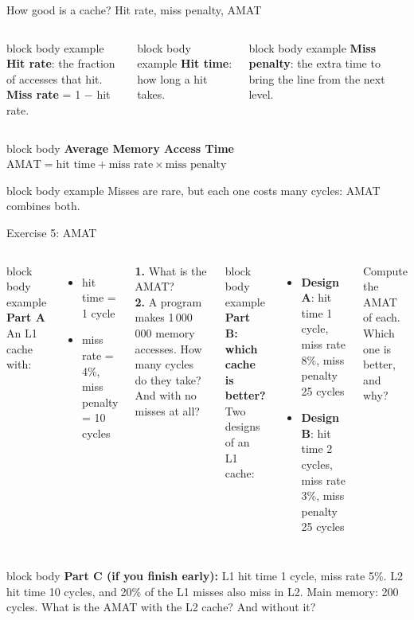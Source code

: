 \documentclass[aspectratio=169,10pt]{beamer}
\newcommand{\defbox}[1]{%
  \begin{beamercolorbox}[rounded=true,sep=0.1cm,wd=\linewidth]{block body example}
    \footnotesize #1
  \end{beamercolorbox}\vspace{0.06cm}}
\newcommand{\taskhead}[2]{%
  \begin{beamercolorbox}[rounded=true,sep=0.12cm,wd=\linewidth]{block body example}
    \small\textbf{#1}\\[0.04cm]
    \footnotesize #2
  \end{beamercolorbox}\vspace{0.1cm}}
\newcommand{\keymsg}[1]{%
  \begin{beamercolorbox}[rounded=true,sep=0.1cm,wd=\textwidth]{block body example}
    \centering\footnotesize #1
  \end{beamercolorbox}}
\begin{document}
\begin{frame}{How good is a cache? Hit rate, miss penalty, AMAT}
  \begin{columns}[T,onlytextwidth]
      \defbox{\textbf{Hit rate}: the fraction of accesses that hit.\\ \textbf{Miss rate} = 1 $-$ hit rate.}
      \defbox{\textbf{Hit time}: how long a hit takes.\\ \phantom{x}}
      \defbox{\textbf{Miss penalty}: the extra time to bring the line from the next level.}
  \end{columns}
  \vspace{0.15cm}
  \begin{beamercolorbox}[rounded=true,sep=0.14cm,wd=\textwidth]{block body}
    \centering
    \textbf{Average Memory Access Time}\\[0.05cm]
    $\displaystyle \text{AMAT} = \text{hit time} + \text{miss rate} \times \text{miss penalty}$
  \end{beamercolorbox}
  \vfill
  \keymsg{Misses are rare, but each one costs many cycles: AMAT combines both.}
\end{frame}

\begin{frame}{Exercise 5: AMAT}
  \begin{columns}[T,onlytextwidth]
      \taskhead{Part A}{An L1 cache with:}
      \footnotesize
      \begin{itemize}\setlength{\itemsep}{2pt}
        \item hit time = 1 cycle
        \item miss rate = 4\%, miss penalty = 10 cycles
      \end{itemize}
      \vspace{0.1cm}
      \textbf{1.} What is the AMAT?\\
      \textbf{2.} A program makes 1\,000\,000 memory accesses. How many cycles do they take? And with no misses at all?
      \taskhead{Part B: which cache is better?}{Two designs of an L1 cache:}
      \footnotesize
      \begin{itemize}\setlength{\itemsep}{2pt}
        \item \textbf{Design A}: hit time 1 cycle, miss rate 8\%, miss penalty 25 cycles
        \item \textbf{Design B}: hit time 2 cycles, miss rate 3\%, miss penalty 25 cycles
      \end{itemize}
      \vspace{0.1cm}
      Compute the AMAT of each. Which one is better, and why?
  \end{columns}
  \vfill
  \begin{beamercolorbox}[rounded=true,sep=0.1cm,wd=\textwidth]{block body}
    \scriptsize\textbf{Part C (if you finish early):} L1 hit time 1 cycle, miss rate 5\%.
    L2 hit time 10 cycles, and 20\% of the L1 misses also miss in L2. Main memory: 200 cycles.
    What is the AMAT with the L2 cache? And without it?
  \end{beamercolorbox}
\end{frame}
\end{document}
